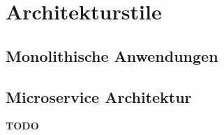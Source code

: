 \section{Architekturstile}

\subsection{Monolithische Anwendungen}

\subsection{Microservice Architektur}

\textbf{TODO}